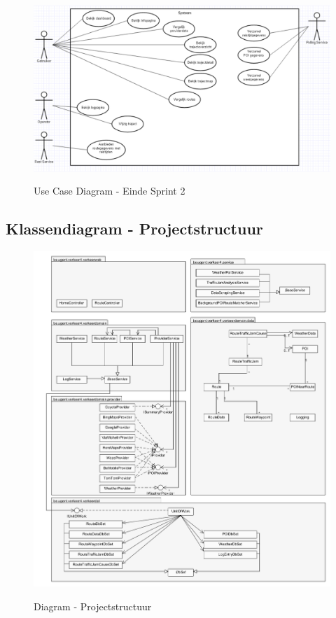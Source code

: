 \documentclass[a4paper]{article}
\begin{document}
\begin{figure}[H]
\centering
\includegraphics[width=\textwidth]{images/ucdiagramsprint2.png}\\
\caption{Use Case Diagram - Einde Sprint 2}
\end{figure}



\subsection{Klassendiagram - Projectstructuur}

\begin{figure}[H]
\centering
\includegraphics[width=\textwidth]{images/projectstructuur.png}\\
\caption{Diagram - Projectstructuur}
\end{figure}
\end{document}
